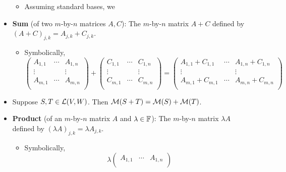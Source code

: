 \documentclass[../main.tex]{subfiles}
\begin{document}
\begin{itemize}
\begin{itemize}
        \item Assuming standard bases, we 
    \end{itemize}
    \item \textbf{Sum} (of two $m$-by-$n$ matrices $A,C$): The $m$-by-$n$ matrix $A+C$ defined by $(A+C)_{j,k}=A_{j,k}+C_{j,k}$.
    \begin{itemize}
        \item Symbolically,
        \begin{equation*}
            \begin{pmatrix}
                A_{1,1} & \cdots & A_{1,n}\\
                \vdots &  & \vdots\\
                A_{m,1} & \cdots & A_{m,n}\\
            \end{pmatrix}+
            \begin{pmatrix}
                C_{1,1} & \cdots & C_{1,n}\\
                \vdots &  & \vdots\\
                C_{m,1} & \cdots & C_{m,n}\\
            \end{pmatrix}
            =
            \begin{pmatrix}
                A_{1,1}+C_{1,1} & \cdots & A_{1,n}+C_{1,n}\\
                \vdots &  & \vdots\\
                A_{m,1}+C_{m,1} & \cdots & A_{m,n}+C_{m,n}\\
            \end{pmatrix}
        \end{equation*}
    \end{itemize}
    \item Suppose $S,T\in\mathcal{L}(V,W)$. Then $\mathcal{M}(S+T)=\mathcal{M}(S)+\mathcal{M}(T)$.
    \item \textbf{Product} (of an $m$-by-$n$ matrix $A$ and $\lambda\in\mathbb{F}$): The $m$-by-$n$ matrix $\lambda A$ defined by $(\lambda A)_{j,k}=\lambda A_{j,k}$.
    \begin{itemize}
        \item Symbolically,
        \begin{equation*}
            \lambda
            \begin{pmatrix}
                A_{1,1} & \cdots & A_{1,n}\\

\end{pmatrix}
\end{equation*}
\end{itemize}
\end{itemize}
\end{document}

